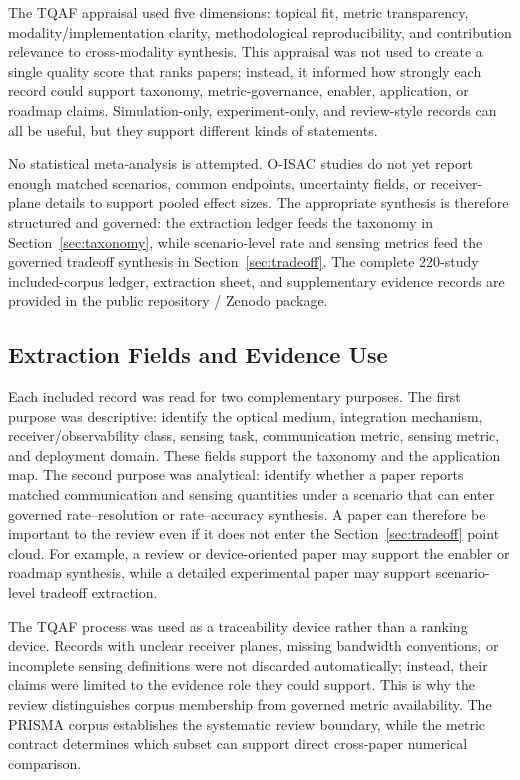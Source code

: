 \documentclass[letterpaper,journal]{IEEEtran}
\begin{document}
The TQAF appraisal used five dimensions: topical fit, metric transparency, modality/implementation clarity, methodological reproducibility, and contribution relevance to cross-modality synthesis. This appraisal was not used to create a single quality score that ranks papers; instead, it informed how strongly each record could support taxonomy, metric-governance, enabler, application, or roadmap claims. Simulation-only, experiment-only, and review-style records can all be useful, but they support different kinds of statements.

No statistical meta-analysis is attempted. O-ISAC studies do not yet report enough matched scenarios, common endpoints, uncertainty fields, or receiver-plane details to support pooled effect sizes. The appropriate synthesis is therefore structured and governed: the extraction ledger feeds the taxonomy in Section~\ref{sec:taxonomy}, while scenario-level rate and sensing metrics feed the governed tradeoff synthesis in Section~\ref{sec:tradeoff}. The complete 220-study included-corpus ledger, extraction sheet, and supplementary evidence records are provided in the public repository / Zenodo package.

\subsection{Extraction Fields and Evidence Use}

Each included record was read for two complementary purposes. The first purpose was descriptive: identify the optical medium, integration mechanism, receiver/observability class, sensing task, communication metric, sensing metric, and deployment domain. These fields support the taxonomy and the application map. The second purpose was analytical: identify whether a paper reports matched communication and sensing quantities under a scenario that can enter governed rate--resolution or rate--accuracy synthesis. A paper can therefore be important to the review even if it does not enter the Section~\ref{sec:tradeoff} point cloud. For example, a review or device-oriented paper may support the enabler or roadmap synthesis, while a detailed experimental paper may support scenario-level tradeoff extraction.

The TQAF process was used as a traceability device rather than a ranking device. Records with unclear receiver planes, missing bandwidth conventions, or incomplete sensing definitions were not discarded automatically; instead, their claims were limited to the evidence role they could support. This is why the review distinguishes corpus membership from governed metric availability. The PRISMA corpus establishes the systematic review boundary, while the metric contract determines which subset can support direct cross-paper numerical comparison.
\end{document}
